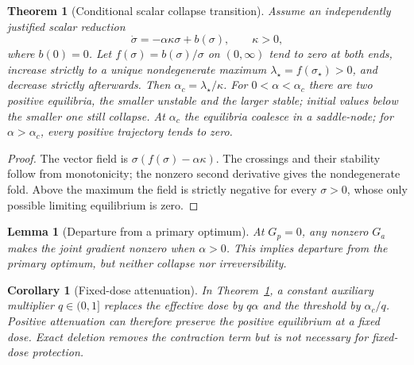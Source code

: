 \documentclass{article}
\newtheorem{lemma}{Lemma}
\newtheorem{theorem}{Theorem}
\newtheorem{corollary}{Corollary}
\begin{document}
\begin{theorem}[Conditional scalar collapse transition]\label{thm:transition}
Assume an independently justified scalar reduction
\begin{equation}
\dot\sigma=-\alpha\kappa\sigma+b(\sigma),\qquad\kappa>0,
\label{eq:flow}
\end{equation}
where $b(0)=0$. Let $f(\sigma)=b(\sigma)/\sigma$ on $(0,\infty)$ tend to zero at both ends, increase strictly to a unique nondegenerate maximum $\lambda_\star=f(\sigma_\star)>0$, and decrease strictly afterwards. Then $\alpha_c=\lambda_\star/\kappa$. For $0<\alpha<\alpha_c$ there are two positive equilibria, the smaller unstable and the larger stable; initial values below the smaller one still collapse. At $\alpha_c$ the equilibria coalesce in a saddle-node; for $\alpha>\alpha_c$, every positive trajectory tends to zero.
\end{theorem}
\begin{proof}
The vector field is $\sigma(f(\sigma)-\alpha\kappa)$. The crossings and their stability follow from monotonicity; the nonzero second derivative gives the nondegenerate fold. Above the maximum the field is strictly negative for every $\sigma>0$, whose only possible limiting equilibrium is zero.
\end{proof}

\begin{lemma}[Departure from a primary optimum]\label{lem:irreversible}
At $G_p=0$, any nonzero $G_a$ makes the joint gradient nonzero when $\alpha>0$. This implies departure from the primary optimum, but neither collapse nor irreversibility.
\end{lemma}

\begin{corollary}[Fixed-dose attenuation]\label{cor:stf}
In Theorem~\ref{thm:transition}, a constant auxiliary multiplier $q\in(0,1]$ replaces the effective dose by $q\alpha$ and the threshold by $\alpha_c/q$. Positive attenuation can therefore preserve the positive equilibrium at a fixed dose. Exact deletion removes the contraction term but is not necessary for fixed-dose protection.
\end{corollary}
\end{document}
